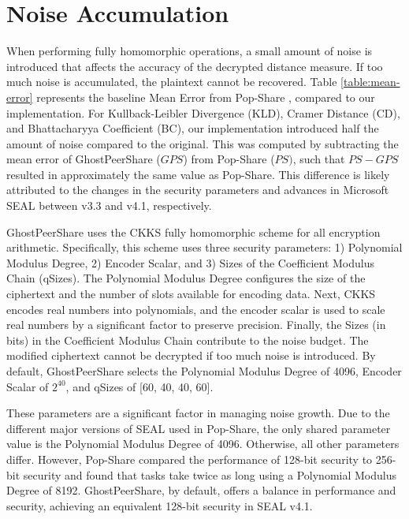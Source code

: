 \section{Noise Accumulation}
\label{sec:Noise Accumulation}
When performing fully homomorphic operations, a small amount of noise is introduced that affects the accuracy of the decrypted distance measure. If too much noise is accumulated, the plaintext cannot be recovered. Table \ref{table:mean-error} represents the baseline Mean Error from Pop-Share \cite{Lagesse2021-PopShare}, compared to our implementation. For Kullback-Leibler Divergence (KLD), Cramer Distance (CD), and Bhattacharyya Coefficient (BC), our implementation introduced half the amount of noise compared to the original. This was computed by subtracting the mean error of GhostPeerShare ($GPS$) from Pop-Share ($PS)$, such that $PS - GPS$ resulted in approximately the same value as Pop-Share. This difference is likely attributed to the changes in the security parameters and advances in Microsoft SEAL between v3.3 and v4.1, respectively.



GhostPeerShare uses the CKKS \cite{Cheon2017-CKKS} fully homomorphic scheme for all encryption arithmetic. Specifically, this scheme uses three security parameters: 1) Polynomial Modulus Degree, 2) Encoder Scalar, and 3) Sizes of the Coefficient Modulus Chain (qSizes). The Polynomial Modulus Degree configures the size of the ciphertext and the number of slots available for encoding data. Next, CKKS encodes real numbers into polynomials, and the encoder scalar is used to scale real numbers by a significant factor to preserve precision. Finally, the Sizes (in bits) in the Coefficient Modulus Chain contribute to the noise budget. The modified ciphertext cannot be decrypted if too much noise is introduced. By default, GhostPeerShare selects the Polynomial Modulus Degree of 4096, Encoder Scalar of $2^{40}$, and qSizes of [60, 40, 40, 60].

These parameters are a significant factor in managing noise growth. Due to the different major versions of SEAL used in Pop-Share, the only shared parameter value is the Polynomial Modulus Degree of 4096. Otherwise, all other parameters differ. However, Pop-Share compared the performance of 128-bit security to 256-bit security and found that tasks take twice as long using a Polynomial Modulus Degree of 8192. GhostPeerShare, by default, offers a balance in performance and security, achieving an equivalent 128-bit security in SEAL v4.1.
